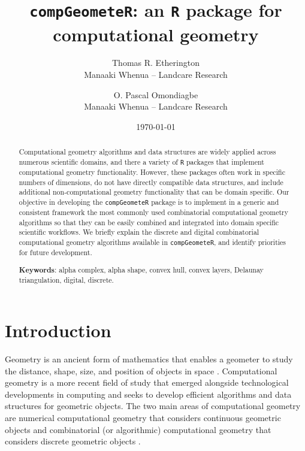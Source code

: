 \documentclass[12pt, a4paper]{article}
\begin{document}
\title{\texttt{compGeometeR}: an \texttt{R} package for computational geometry}

\author{Thomas R. Etherington  \\
	Manaaki Whenua -- Landcare Research  \\
	\and 
	O. Pascal Omondiagbe \\
	Manaaki Whenua -- Landcare Research \\
	}



\date{\today}



\maketitle


\begin{abstract}

Computational geometry algorithms and data structures are widely applied across numerous scientific domains, and there a variety of \texttt{R} packages that implement computational geometry functionality.  However, these packages often work in specific numbers of dimensions, do not have directly compatible data structures, and include additional non-computational geometry functionality that can be domain specific.  Our objective in developing the \texttt{compGeometeR} package is to implement in a generic and consistent framework the most commonly used combinatorial computational geometry algorithms so that they can be easily combined and integrated into domain specific scientific workflows.  We briefly explain the discrete and digital combinatorial computational geometry algorithms available in \texttt{compGeometeR}, and identify priorities for future development.

\begin{center}
\textbf{Keywords}: alpha complex, alpha shape, convex hull, convex layers, Delaunay triangulation, digital, discrete.
\end{center}

\end{abstract}

\section{Introduction}

Geometry is an ancient form of mathematics that enables a geometer to study the distance, shape, size, and position of objects in space \citep{gowers-2003}.  Computational geometry is a more recent field of study that emerged alongside technological developments in computing and seeks to develop efficient algorithms and data structures for geometric objects.  The two main areas of computational geometry are numerical computational geometry that considers continuous geometric objects \citep{kimmel-2012} and combinatorial (or algorithmic) computational geometry that considers discrete geometric objects \citep{boissonnat-1998, de-berg-2008}.
\end{document}
